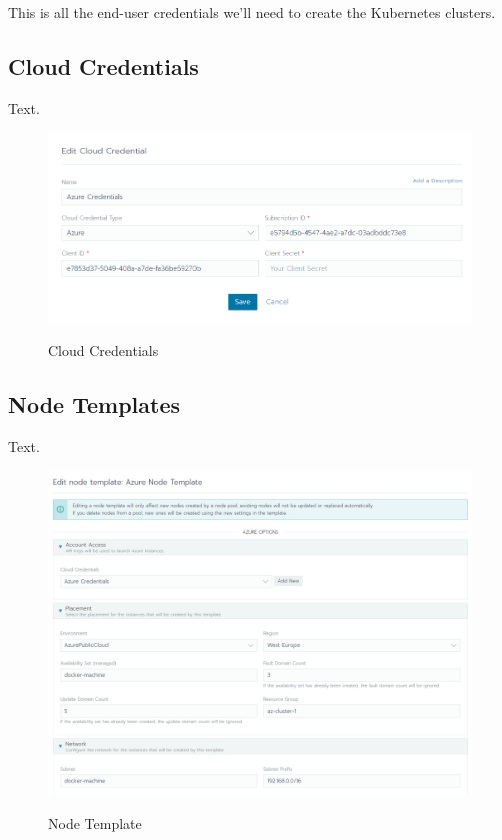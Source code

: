 This is all the end-user credentials we'll need to create the Kubernetes clusters.

\subsection{Cloud Credentials}

Text.

\begin{figure}[H]
\centering
\caption {Cloud Credentials}
\includegraphics[width=\linewidth]{images/cloud-credentials.png}
\label{fig:cloudCredentials}
\end{figure}

\subsection{Node Templates}

Text. 

\begin{figure}[H]
\centering
\caption {Node Template}
\includegraphics[width=\linewidth]{images/node-template.png}
\label{fig:nodeTemplate}
\end{figure}

